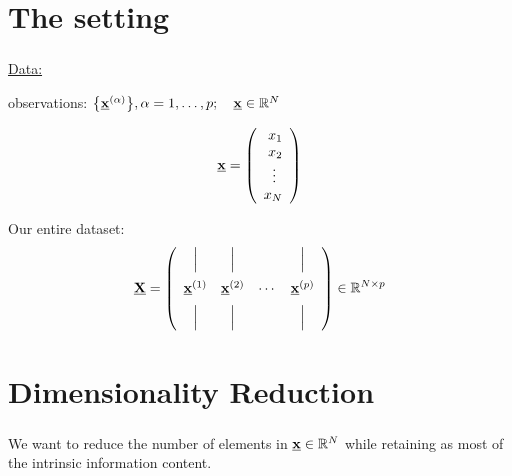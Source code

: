\section{The setting}

\begin{frame}\frametitle{\secname}
    
\underline{Data:}

observations: $\big\{ \underline{\mathbf{x}}^{(\alpha)} \big\}, \alpha = 1, \ldots, p; \quad \underline{\mathbf{x}} \in \mathbb{R}^N$

$$
\underline{\mathbf{x}} = \left( \begin{array}{rrrrrrrrrrrrrrrrrrrrrrrrrr} 
x_1\\
x_2\\
\vdots\;\,\\
x_N
\\ \end{array} \right)
$$

Our entire dataset:
\[
\underline{\mathbf{X}} = 
\left(
\begin{array}{cccc}
\Big| & \Big| & &\Big| \\[3mm]
\underline{\mathbf{x}}^{(1)} & \underline{\mathbf{x}}^{(2)} & \cdots &\underline{\mathbf{x}}^{(p)}\\[2mm]
\Big| & \Big| & &\Big|
\end{array}
\right) \in \mathbb{R}^{N \times p}
\]

\end{frame}

\section{Dimensionality Reduction}

\begin{frame}\frametitle{\secname}
We want to reduce the number of elements in $\underline{\mathbf{x}} \in \mathbb{R}^N$
while retaining as most of the intrinsic information content.



\end{frame}

